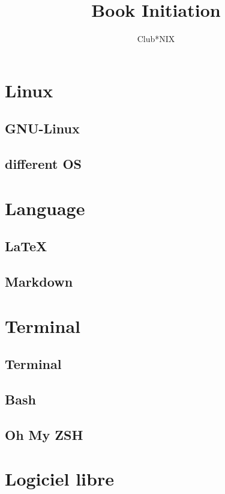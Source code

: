 \documentclass[a4paper]{report}
\title{Book Initiation}
\author{Club*NIX}
\begin{document}
\maketitle

\tableofcontents
\newpage


\chapter{Linux}
 \section{GNU-Linux}
    
 \section{different OS}
    
    
\chapter{Language}
  \section{LaTeX}
    
  \section{Markdown}
    
    
\chapter{Terminal}
  \section{Terminal}
    
  \section{Bash}
    
  \section{Oh My ZSH}
    
    
\chapter{Logiciel libre}
	
\end{document}
